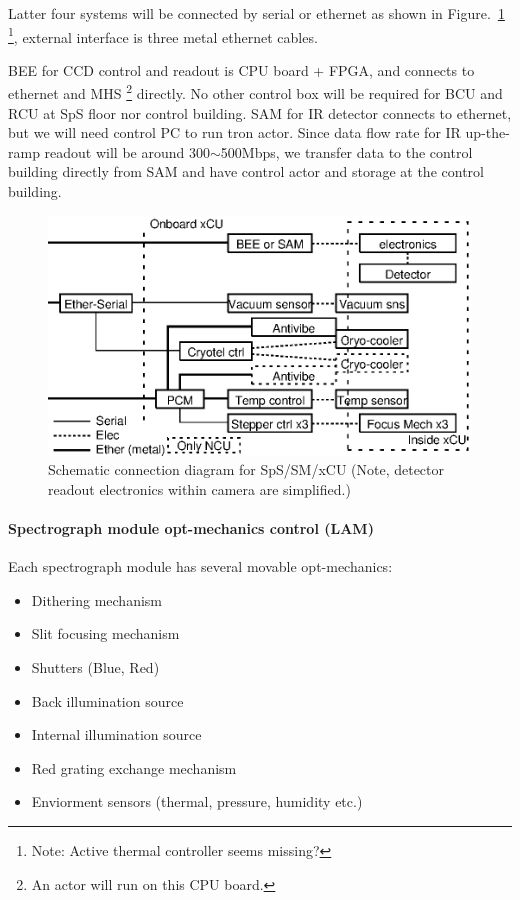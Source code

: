 \documentclass[a4paper,notitlepage]{article}
\begin{document}
Latter four systems will be connected by serial or ethernet as shown in 
Figure.~\ref{fig:sps-xcu-control}
\footnote{Note: Active thermal controller seems missing?}, 
external interface is three metal ethernet cables. 

BEE for CCD control and readout is CPU board + FPGA, and connects to 
ethernet and MHS \footnote{An actor will run on this CPU board.} directly. 
No other control box will be required for BCU and RCU at SpS floor nor 
control building. 
SAM for IR detector connects to ethernet, but we will need control PC 
to run tron actor. Since data flow rate for IR up-the-ramp readout will be 
around 300$\sim$500Mbps, we transfer data to the control building directly 
from SAM and have control actor and storage at the control building. 


\begin{figure}[htb]
  \begin{center}
    \includegraphics{networks-xcu.eps}
  \end{center}
  \caption{Schematic connection diagram for SpS/SM/xCU
     (Note, detector readout electronics within camera are simplified.)}
  \label{fig:sps-xcu-control}
\end{figure}


\paragraph{Spectrograph module opt-mechanics control (LAM)}

Each spectrograph module has several movable opt-mechanics: 

\begin{itemize}
  \item Dithering mechanism
  \item Slit focusing mechanism
  \item Shutters (Blue, Red)
  \item Back illumination source
  \item Internal illumination source
  \item Red grating exchange mechanism
  \item Enviorment sensors (thermal, pressure, humidity etc.)
\end{itemize}
\end{document}
